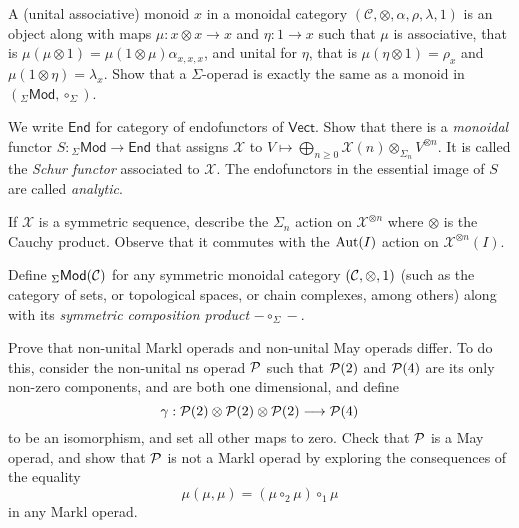 \begin{question}
A (unital associative) monoid $x$ in a monoidal category 
$(\mathcal C,\otimes,\alpha,\rho,\lambda,1)$ is an object
along with maps $\mu: x\otimes x\to x$ and $\eta : 1
 \longrightarrow x$ such that $\mu$ is associative, 
 that is $\mu (\mu\otimes 1) = \mu(1\otimes \mu)
 \alpha_{x,x,x}$, and unital for
$\eta$, that is $\mu(\eta\otimes 1)=\rho_x$
and $\mu(1\otimes \eta) = \lambda_x$.
Show that a $\Sigma$-operad is exactly the
same as a monoid in $({}_\Sigma\mathsf{Mod},\circ_\Sigma)$.
\end{question}

\begin{question}
We write $\mathsf{End}$ for
 category of endofunctors of $\mathsf{Vect}$. Show
 that there is a \emph{monoidal}
 functor $S:{}_\Sigma\mathsf{Mod}
 \longrightarrow \mathsf{End}$ that assigns
 $\mathcal{X}$ to $V\longmapsto \bigoplus_{n\geqslant 0} \mathcal{X}(n)\otimes_{\Sigma_n} V^{\otimes n}$.
 It is called the \emph{Schur functor} associated
 to $\mathcal{X}$. The endofunctors in the essential
 image of $S$ are called \emph{analytic}.
\end{question}

\begin{question}
	 If $\mathcal{X}$
	 is a symmetric sequence, describe the $\Sigma_n$
	 action on $\mathcal{X}^{\otimes n}$ where
	 $\otimes$ is the Cauchy product. Observe that
	 it commutes with the $\operatorname{Aut}(I)$ action on 
	 $\mathcal{X}^{\otimes n}(I)$.
\end{question}
	 
\begin{question}
Define ${}_\Sigma\mathsf{Mod}(\mathcal{C})$
for any symmetric monoidal category $(\mathcal{C},\otimes,1)$
(such as the category of sets, or topological spaces,
or chain complexes, among others) along with
its \emph{symmetric composition product}
 $-\circ_\Sigma - $.
 \end{question}
 
\begin{question} Prove that non-unital Markl operads
and non-unital May operads differ.
To do this, consider the non-unital ns operad
${\mathcal{P}}$ such that ${\mathcal{P}}(2)$ and ${\mathcal{P}}(4)$
are its only non-zero components, and are
both one dimensional, and define
\[ \gamma : {\mathcal{P}}(2)\otimes {\mathcal{P}}(2)\otimes {\mathcal{P}}(2)
 	\longrightarrow {\mathcal{P}}(4) \]
to be an isomorphism, and set all other maps to zero. 
Check that ${\mathcal{P}}$ is a May operad, and
show that ${\mathcal{P}}$ is not a Markl
operad by exploring the consequences
of the equality
\[ \mu(\mu,\mu) = (\mu \circ_2\mu)\circ_1 \mu \]
in any Markl operad.
\end{question}

